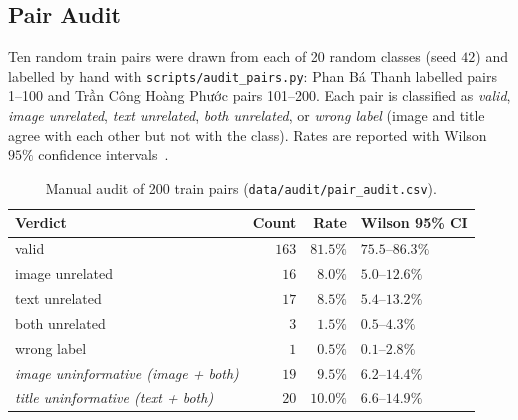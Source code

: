 \subsection{Pair Audit}
\label{sec:audit}

Ten random train pairs were drawn from each of 20 random classes (seed $42$) and labelled by hand with
\texttt{scripts/audit\_pairs.py}: Phan Bá Thanh labelled pairs 1--100 and Trần Công Hoàng Phước pairs 101--200.
Each pair is classified as \emph{valid}, \emph{image unrelated}, \emph{text unrelated}, \emph{both unrelated},
or \emph{wrong label} (image and title agree with each other but not with the class). Rates are reported with
Wilson $95\%$ confidence intervals~\cite{wilson1927}.

\begin{table}[H]
  \centering\small
  \caption{Manual audit of 200 train pairs (\texttt{data/audit/pair\_audit.csv}).}
  \label{tab:audit}
  \begin{tabular}{@{}lrrl@{}}
    \toprule
    Verdict & Count & Rate & Wilson 95\% CI \\
    \midrule
    valid           & $163$ & $\mathbf{81.5\%}$ & $75.5$--$86.3\%$ \\
    image unrelated & $16$  & $8.0\%$  & $5.0$--$12.6\%$ \\
    text unrelated  & $17$  & $8.5\%$  & $5.4$--$13.2\%$ \\
    both unrelated  & $3$   & $1.5\%$  & $0.5$--$4.3\%$ \\
    wrong label     & $1$   & $0.5\%$  & $0.1$--$2.8\%$ \\
    \midrule
    \textit{image uninformative (image + both)} & $19$ & $9.5\%$  & $6.2$--$14.4\%$ \\
    \textit{title uninformative (text + both)}  & $20$ & $10.0\%$ & $6.6$--$14.9\%$ \\
    \bottomrule
  \end{tabular}
\end{table}

